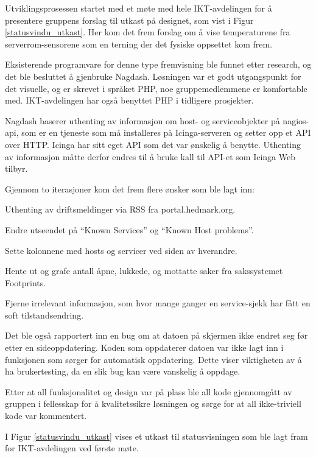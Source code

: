Utviklingsprosessen startet med et møte med hele IKT-avdelingen for å presentere gruppens forslag til utkast på designet, som vist i Figur \ref{statusvindu_utkast}. Her kom det frem forslag om å vise temperaturene fra serverrom-sensorene som en terning der det fysiske oppsettet kom frem.

Eksisterende programvare for denne type fremvisning ble funnet etter research, og det ble besluttet å gjenbruke Nagdash\cite{nagdash}. Løsningen var et godt utgangspunkt for det visuelle, og er skrevet i språket PHP, noe gruppemedlemmene er komfortable med. IKT-avdelingen har også benyttet PHP i tidligere prosjekter. 

Nagdash baserer uthenting av informasjon om host- og serviceobjekter på nagios-api\cite{nagiosapi}, som er en tjeneste som må installeres på Icinga-serveren og setter opp et API over HTTP. Icinga har sitt eget API som det var ønskelig å benytte. Uthenting av informasjon måtte derfor endres til å bruke kall til API-et som Icinga Web tilbyr\cite{icingarestapi}.

Gjennom to iterasjoner kom det frem flere ønsker som ble lagt inn:
\begin{itemize*}
	 \item Uthenting av driftsmeldinger via RSS fra portal.hedmark.org.
	 \item Endre utseendet på ``Known Services'' og ``Known Host problems''.
	 \item Sette kolonnene med hosts og servicer ved siden av hverandre.
	 \item Hente ut og grafe antall åpne, lukkede, og mottatte saker fra sakssystemet Footprints.
	 \item Fjerne irrelevant informasjon, som hvor mange ganger en service-sjekk har fått en soft tilstandsendring.
\end{itemize*}

Det ble også rapportert inn en bug om at datoen på skjermen ikke endret seg før etter en sideoppdatering. Koden som oppdaterer datoen var ikke lagt inn i funksjonen som sørger for automatisk oppdatering. Dette viser viktigheten av å ha brukertesting, da en slik bug kan være vanskelig å oppdage.

Etter at all funksjonalitet og design var på plass ble all kode gjennomgått av gruppen i fellesskap for å kvalitetssikre løsningen og sørge for at all ikke-triviell kode var kommentert.

I Figur \ref{statusvindu_utkast} vises et utkast til statusvisningen som ble lagt fram for IKT-avdelingen ved første møte.

